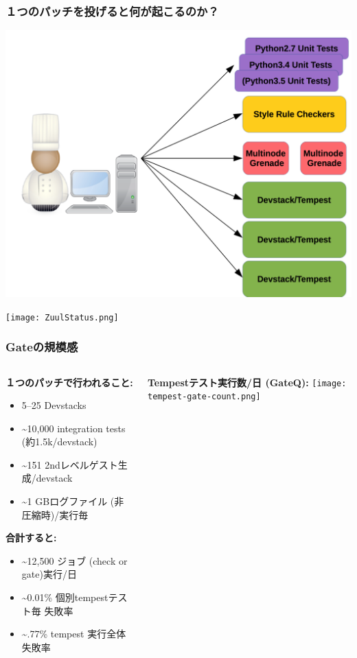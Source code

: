\documentclass[aspectratio=169,11pt,hyperref={colorlinks=true}]{beamer}
\begin{document}
\begin{frame}
  \frametitle{１つのパッチを投げると何が起こるのか？}
  \begin{center}
    \includegraphics[width=.7\textwidth]{jobs.png}
  \end{center}
\end{frame}

\begin{frame}
  \begin{center}
      \texttt{[image: ZuulStatus.png]}
  \end{center}
\end{frame}

\begin{frame}
\frametitle{Gateの規模感}
    \begin{columns}[T]
      \begin{column}{.50\textwidth}
        \textbf{１つのパッチで行われること:}
        \begin{itemize}
          \item 5--25 Devstacks
          \item \textasciitilde10,000 integration tests (約1.5k/devstack)
          \item \textasciitilde151 2ndレベルゲスト生成/devstack
          \item \textasciitilde1 GBログファイル (非圧縮時)/実行毎
        \end{itemize}
        \textbf{合計すると:}
        \begin{itemize}
          \item \textasciitilde12,500 ジョブ (check or gate)実行/日
          \item \textasciitilde0.01\% 個別tempestテスト毎 失敗率
          \item \textasciitilde.77\% tempest 実行全体 失敗率
        \end{itemize}
      \end{column}
      \begin{column}{.48\textwidth}
          \centering
          \textbf{Tempestテスト実行数/日 (GateQ):}
          \texttt{[image: tempest-gate-count.png]}
      \end{column}
    \end{columns}
\end{frame}
\end{document}
